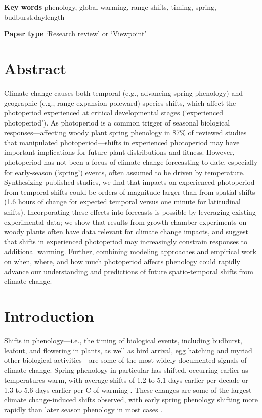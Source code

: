 \documentclass{article}
\begin{document}
\textbf{Key words} phenology, global warming, range shifts, timing, spring, budburst,daylength 

\textbf{Paper type} `Research review' or `Viewpoint'



\newpage
\linenumbers
\section*{Abstract}
Climate change causes both temporal (e.g., advancing spring phenology) and geographic (e.g., range expansion poleward) species shifts, which affect the photoperiod experienced at critical developmental stages (`experienced photoperiod'). As photoperiod is a common trigger of seasonal biological responses---affecting woody plant spring phenology in 87\% of reviewed studies that manipulated photoperiod---shifts in experienced photoperiod may have important implications for future plant distributions and fitness. However, photoperiod has not been a focus of climate change forecasting to date, especially for early-season (`spring') events, often assumed to be driven by temperature. Synthesizing published studies, we find that impacts on experienced photoperiod from temporal shifts could be orders of magnitude larger than from spatial shifts (1.6 hours of change for expected temporal versus one minute for latitudinal shifts). Incorporating these effects into forecasts is possible by leveraging existing experimental data; we show that results from growth chamber experiments on woody plants often have data relevant for climate change impacts, and suggest that shifts in experienced photoperiod may increasingly constrain responses to additional warming. Further, combining modeling approaches and empirical work on when, where, and how much photoperiod affects phenology could rapidly advance our understanding and predictions of future spatio-temporal shifts from climate change. 

\newpage
\section*{Introduction}

\par Shifts in phenology---i.e., the timing of biological events, including budburst, leafout, and flowering in plants, as well as bird arrival, egg hatching and myriad other biological activities---are some of the most widely documented signals of climate change. Spring phenology in particular has shifted, occurring earlier as temperatures warm, with average shifts of 1.2 to 5.1 days earlier per decade \citep{bradley1999,parmesan2003, poloczanska2013,root2003} or 1.3 to 5.6 days earlier per \degree C of warming \citep{polgar2013,Wolkovich:2012n}. These changes are some of the largest climate change-induced shifts observed, with early spring phenology shifting more rapidly than later season phenology in most cases \citep{bradley1999,menzel2006}. 
\end{document}

